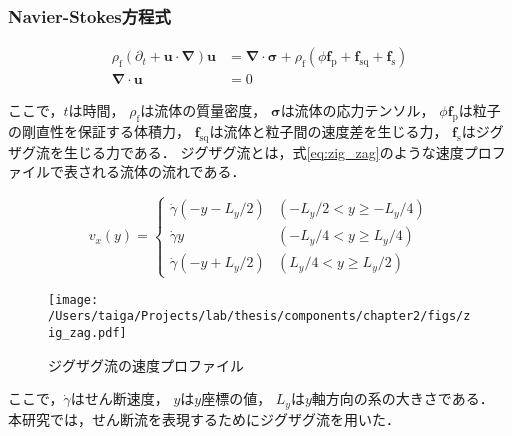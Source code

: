\subsubsection{Navier-Stokes方程式}
    \begin{align}
        \rho_\mathrm{f} (\partial _t + \boldsymbol{u} \cdot \boldsymbol{\nabla} ) \boldsymbol{u} &= 
            \boldsymbol{\nabla} \cdot \boldsymbol{\sigma} + 
            \rho_\mathrm{f} (\phi \boldsymbol{f}_\mathrm{p} + \boldsymbol{f}_\mathrm{sq} + \boldsymbol{f}_\mathrm{s}) \\
        \boldsymbol{\nabla} \cdot \boldsymbol{u} &= 0
    \end{align}

ここで，$t$は時間，
$\rho_\mathrm{f}$は流体の質量密度，
$\boldsymbol{\sigma}$は流体の応力テンソル，
$\phi \boldsymbol{f}_\mathrm{p}$は粒子の剛直性を保証する体積力，
$\boldsymbol{f}_\mathrm{sq}$は流体と粒子間の速度差を生じる力，
$\boldsymbol{f}_\mathrm{s}$はジグザグ流を生じる力である．
ジグザグ流とは，式\eqref{eq:zig_zag}のような速度プロファイルで表される流体の流れである．

    \begin{equation}
        v_x(y) =
        \begin{cases}
            \dot{\gamma} \left( - y -L_y/2 \right) & (-L_y/2 < y \geq -L_y/4) \\
            \dot{\gamma} y                        & (-L_y/4 < y \geq  L_y/4) \\
            \dot{\gamma} \left( - y + L_y/2 \right) & ( L_y/4 < y \geq  L_y/2)
        \end{cases}
        \label{eq:zig_zag}
    \end{equation}

    \begin{figure}[htbp]
        \centering
        \texttt{[image: /Users/taiga/Projects/lab/thesis/components/chapter2/figs/zig\_zag.pdf]}
        \caption{ジグザグ流の速度プロファイル}
        \label{fig:zig_zag}
    \end{figure}

\noindent
ここで，$\dot{\gamma}$はせん断速度，
$y$は$y$座標の値，
$L_y$は$y$軸方向の系の大きさである．
本研究では，せん断流を表現するためにジグザグ流を用いた．
